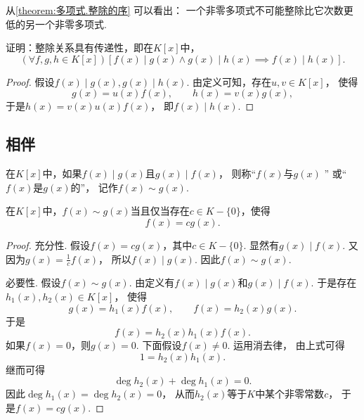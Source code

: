 从\cref{theorem:多项式.整除的序} 可以看出：
一个非零多项式不可能整除比它次数更低的另一个非零多项式.

\begin{example}
证明：整除关系具有传递性，即在\(K[x]\)中，\begin{equation*}
	(\forall f,g,h \in K[x])
	[
		f(x) \mid g(x) \land g(x) \mid h(x)
		\implies
		f(x) \mid h(x)
	].
\end{equation*}
\begin{proof}
假设\(f(x) \mid g(x), g(x) \mid h(x)\).
由定义可知，存在\(u,v \in K[x]\)，
使得\begin{equation*}
	g(x) = u(x) f(x), \qquad
	h(x) = v(x) g(x),
\end{equation*}
于是\(h(x) = v(x) u(x) f(x)\)，
即\(f(x) \mid h(x)\).
\end{proof}
\end{example}

\subsection{相伴}
\begin{definition}
在\(K[x]\)中，如果\(f(x) \mid g(x)\)且\(g(x) \mid f(x)\)，
则称“\(f(x)\)与\(g(x)\) ”
或“\(f(x)\)是\(g(x)\)的”，
记作\(f(x) \sim g(x)\).
\end{definition}

\begin{proposition}
在\(K[x]\)中，\(f(x) \sim g(x)\)当且仅当存在\(c \in K-\{0\}\)，使得\begin{equation*}
	f(x) = c g(x).
\end{equation*}
\begin{proof}
充分性.
假设\(f(x)=c g(x)\)，其中\(c \in K-\{0\}\).
显然有\(g(x) \mid f(x)\).
又因为\(g(x)=\frac1c f(x)\)，
所以\(f(x) \mid g(x)\).
因此\(f(x) \sim g(x)\).

必要性.
假设\(f(x) \sim g(x)\).
由定义有\(f(x) \mid g(x)\)和\(g(x) \mid f(x)\).
于是存在\(h_1(x),h_2(x) \in K[x]\)，
使得\begin{equation*}
	g(x) = h_1(x) f(x), \qquad
	f(x) = h_2(x) g(x).
\end{equation*}
于是\begin{equation*}
	f(x) = h_2(x) h_1(x) f(x).
\end{equation*}
如果\(f(x)=0\)，则\(g(x)=0\).
下面假设\(f(x)\neq0\).
运用消去律，
由上式可得\begin{equation*}
	1 = h_2(x) h_1(x).
\end{equation*}
继而可得\begin{equation*}
	\deg h_2(x) + \deg h_1(x) = 0.
\end{equation*}
因此\(\deg h_1(x) = \deg h_2(x) = 0\)，
从而\(h_2(x)\)等于\(K\)中某个非零常数\(c\)，
于是\(f(x) = c g(x)\).
\end{proof}
\end{proposition}

